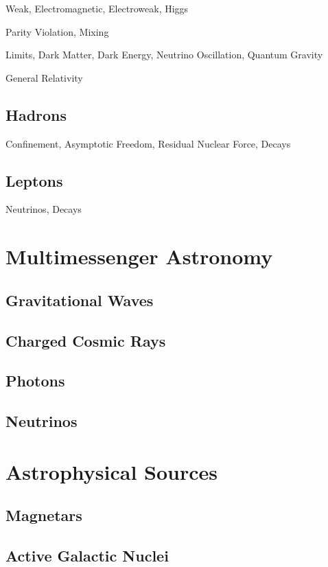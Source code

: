 \newpage

Weak, Electromagnetic, Electroweak, Higgs

Parity Violation, Mixing

Limits, Dark Matter, Dark Energy, Neutrino Oscillation, Quantum Gravity

General Relativity

\subsection*{Hadrons}
\label{sub:hadrons}

Confinement, Asymptotic Freedom, Residual Nuclear Force, Decays

\subsection*{Leptons}
\label{sub:leptons}

Neutrinos, Decays

\section{Multimessenger Astronomy}
\label{sec:multimessenger}

\subsection*{Gravitational Waves}
\label{sub:gravitational}

\subsection*{Charged Cosmic Rays}
\label{sub:rays}

\subsection*{Photons}
\label{sub:photons}

\subsection*{Neutrinos}
\label{sub:neutrinos}

\section{Astrophysical Sources}
\label{sec:sources}

\subsection*{Magnetars}
\label{sub:magnetars}

\subsection*{Active Galactic Nuclei}
\label{sub:nuclei}
